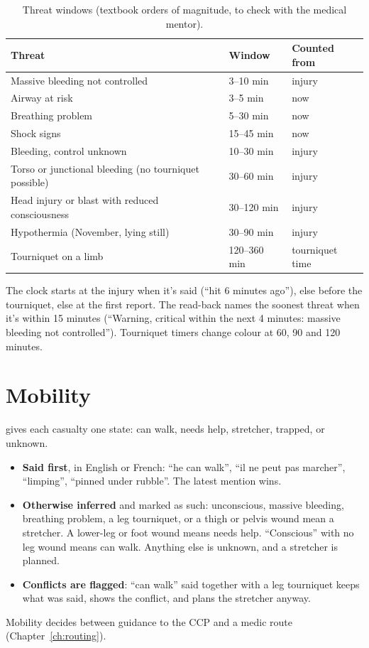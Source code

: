 \begin{table}[htbp]\centering\small
\caption{Threat windows (textbook orders of magnitude, to check with the medical mentor).}\label{tab:windows}
\begin{tabular}{lll}
\toprule
Threat & Window & Counted from\\
\midrule
Massive bleeding not controlled & 3--10 min & injury\\
Airway at risk & 3--5 min & now\\
Breathing problem & 5--30 min & now\\
Shock signs & 15--45 min & now\\
Bleeding, control unknown & 10--30 min & injury\\
Torso or junctional bleeding (no tourniquet possible) & 30--60 min & injury\\
Head injury or blast with reduced consciousness & 30--120 min & injury\\
Hypothermia (November, lying still) & 30--90 min & injury\\
Tourniquet on a limb & 120--360 min & tourniquet time\\
\bottomrule
\end{tabular}
\end{table}

The clock starts at the injury when it's said (``hit 6 minutes ago''), else before the tourniquet, else at the
first report. The read-back names the soonest threat when it's within 15 minutes (``Warning, critical within the
next 4 minutes: massive bleeding not controlled''). Tourniquet timers change colour at 60, 90 and 120 minutes.

\section{Mobility}

 gives each casualty one state: can walk, needs help, stretcher, trapped, or unknown.
\begin{itemize}
  \item \textbf{Said first}, in English or French: ``he can walk'', ``il ne peut pas marcher'', ``limping'', ``pinned
        under rubble''. The latest mention wins.
  \item \textbf{Otherwise inferred} and marked as such: unconscious, massive bleeding, breathing problem, a leg
        tourniquet, or a thigh or pelvis wound mean a stretcher. A lower-leg or foot wound means needs help.
        ``Conscious'' with no leg wound means can walk. Anything else is unknown, and a stretcher is planned.
  \item \textbf{Conflicts are flagged}: ``can walk'' said together with a leg tourniquet keeps what was said, shows
        the conflict, and plans the stretcher anyway.
\end{itemize}
Mobility decides between guidance to the CCP and a medic route (Chapter~\ref{ch:routing}).

